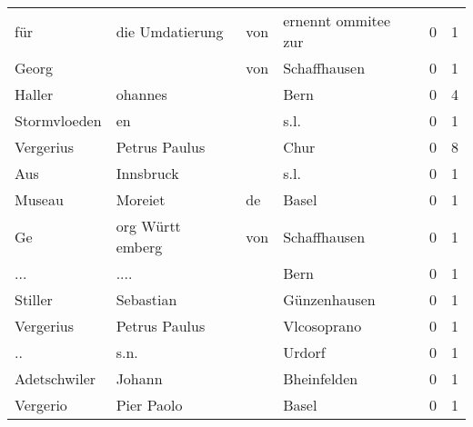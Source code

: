 \begin{center}
\begin{tiny}
\begin{longtabu}{llllrr}
                      für &                    die Umdatierung &         von &                         ernennt ommitee zur &          0 &         1 \\
                    Georg &                                    &         von &                                Schaffhausen &          0 &         1 \\
                   Haller &                            ohannes &             &                                        Bern &          0 &         4 \\
             Stormvloeden &                                 en &             &                                        s.l. &          0 &         1 \\
                Vergerius &                      Petrus Paulus &             &                                        Chur &          0 &         8 \\
                      Aus &                          Innsbruck &             &                                        s.l. &          0 &         1 \\
                   Museau &                            Moreiet &          de &                                       Basel &          0 &         1 \\
                       Ge &                  org  Württ emberg &         von &                                Schaffhausen &          0 &         1 \\
                      ... &                               .... &             &                                        Bern &          0 &         1 \\
                  Stiller &                          Sebastian &             &                                Günzenhausen &          0 &         1 \\
                Vergerius &                      Petrus Paulus &             &                                 Vlcosoprano &          0 &         1 \\
                       .. &                               s.n. &             &                                      Urdorf &          0 &         1 \\
             Adetschwiler &                             Johann &             &                                 Bheinfelden &          0 &         1 \\
                 Vergerio &                         Pier Paolo &             &                                       Basel &          0 &         1 \\

\end{longtabu}
\end{tiny}
\end{center}
